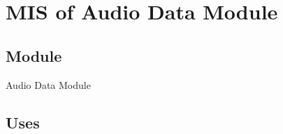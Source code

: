 \documentclass[12pt, titlepage]{article}
\begin{document}









\section{MIS of Audio Data Module} \label{Module_AudioData}

\subsection{Module}

Audio Data Module

\subsection{Uses}
\end{document}
